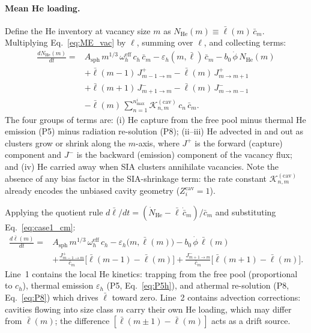 \paragraph{Mean He loading.}
Define the He inventory at vacancy size $m$ as
$N_{\mathrm{He}}(m) \equiv \bar{\ell}(m)\,\bar{c}_m$.
Multiplying Eq.~\eqref{eq:ME_vac} by $\ell$, summing over $\ell$, and
collecting terms:
\begin{equation}\label{eq:case1_NHe}
\begin{split}
    \frac{dN_{\mathrm{He}}(m)}{dt} = {} &
      A_{\mathrm{sph}}\,m^{1/3}\,\omega_h^{\mathrm{eff}}\,
      c_h\,\bar{c}_m
    - \varepsilon_h(m,\bar{\ell})\,\bar{c}_m
    - b_0\,\dot{\phi}\,N_{\mathrm{He}}(m)
    \\[3pt]
    &+ \bar{\ell}(m{-}1)\,J_{m-1 \to m}^{+}
     - \bar{\ell}(m)\,J_{m \to m+1}^{+}
    \\
    &+ \bar{\ell}(m{+}1)\,J_{m+1 \to m}^{-}
     - \bar{\ell}(m)\,J_{m \to m-1}^{-}
    \\[3pt]
    &- \bar{\ell}(m)\,
       \sum_{n=1}^{n_{\max}^i}
       \mathcal{K}_{n,m}^{(\mathrm{cav})}\,c_n\,\bar{c}_m.
\end{split}
\end{equation}
The four groups of terms are: (i) He capture from the free pool minus
thermal He emission (P5) minus radiation re-solution (P8); (ii--iii) He
advected in and out as clusters grow or shrink along the $m$-axis,
where $J^+$ is the forward (capture) component and $J^-$ is the
backward (emission) component of the vacancy flux; and (iv) He carried
away when SIA clusters annihilate vacancies. Note the absence of any
bias factor in the SIA-shrinkage term: the rate constant
$\mathcal{K}_{n,m}^{(\mathrm{cav})}$ already encodes the unbiased
cavity geometry ($Z_i^{\mathrm{cav}} = 1$).

Applying the quotient rule
$d\bar{\ell}/dt = (\dot{N}_{\mathrm{He}} - \bar{\ell}\,\dot{\bar{c}}_m)
/ \bar{c}_m$ and substituting Eq.~\eqref{eq:case1_cm}:
\begin{equation}\label{eq:case1_lbar}
\boxed{
\begin{split}
    \frac{d\bar{\ell}(m)}{dt} = {} &
      A_{\mathrm{sph}}\,m^{1/3}\,\omega_h^{\mathrm{eff}}\,c_h
    - \varepsilon_h\bigl(m,\bar{\ell}(m)\bigr)
    - b_0\,\dot{\phi}\,\bar{\ell}(m)
    \\[3pt]
    &+ \frac{J_{m-1 \to m}^{+}}{\bar{c}_m}
       \bigl[\bar{\ell}(m{-}1) - \bar{\ell}(m)\bigr]
     + \frac{J_{m+1 \to m}^{-}}{\bar{c}_m}
       \bigl[\bar{\ell}(m{+}1) - \bar{\ell}(m)\bigr].
\end{split}
}
\end{equation}
Line~1 contains the local He kinetics: trapping from the free pool
(proportional to $c_h$), thermal emission $\varepsilon_h$ (P5,
Eq.~\ref{eq:P5h}), and athermal re-solution (P8, Eq.~\ref{eq:P8})
which drives $\bar{\ell}$ toward zero. Line~2 contains advection
corrections: cavities flowing into size class $m$ carry their own He
loading, which may differ from $\bar{\ell}(m)$; the difference
$[\bar{\ell}(m\pm 1) - \bar{\ell}(m)]$ acts as a drift source.

